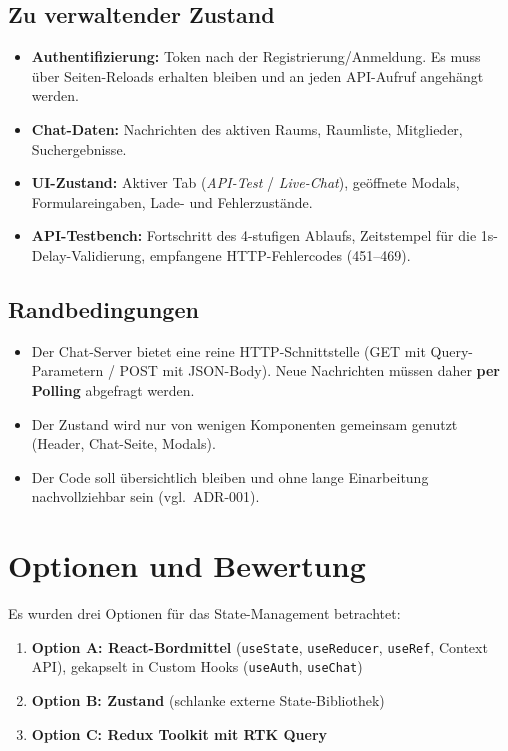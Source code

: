 \documentclass[a4paper,11pt]{article}
\newcommand{\code}[1]{\colorbox{codebg}{\texttt{\small #1}}}
\begin{document}
\subsection*{Zu verwaltender Zustand}
\begin{itemize}
    \item \textbf{Authentifizierung:} Token nach der Registrierung/Anmeldung.
          Es muss über Seiten-Reloads erhalten bleiben und an jeden
          API-Aufruf angehängt werden.
    \item \textbf{Chat-Daten:} Nachrichten des aktiven Raums, Raumliste,
          Mitglieder, Suchergebnisse.
    \item \textbf{UI-Zustand:} Aktiver Tab (\textit{API-Test} /
          \textit{Live-Chat}), geöffnete Modals, Formulareingaben, Lade- und
          Fehlerzustände.
    \item \textbf{API-Testbench:} Fortschritt des 4-stufigen Ablaufs,
          Zeitstempel für die 1s-Delay-Validierung, empfangene
          HTTP-Fehlercodes (451--469).
\end{itemize}

\subsection*{Randbedingungen}
\begin{itemize}
    \item Der Chat-Server bietet eine reine HTTP-Schnittstelle (GET mit
          Query-Parametern / POST mit JSON-Body). Neue Nachrichten müssen
          daher \textbf{per Polling} abgefragt werden.
    \item Der Zustand wird nur von wenigen Komponenten gemeinsam genutzt
          (Header, Chat-Seite, Modals).
    \item Der Code soll übersichtlich bleiben und ohne lange Einarbeitung
          nachvollziehbar sein (vgl.\ ADR-001).
\end{itemize}

\section{Optionen und Bewertung}
Es wurden drei Optionen für das State-Management betrachtet:
\begin{enumerate}
    \item \textbf{Option A: React-Bordmittel} (\code{useState}, \code{useReducer},
          \code{useRef}, Context API), gekapselt in Custom Hooks
          (\code{useAuth}, \code{useChat})
    \item \textbf{Option B: Zustand} (schlanke externe State-Bibliothek)
    \item \textbf{Option C: Redux Toolkit mit RTK Query}
\end{enumerate}
\end{document}
